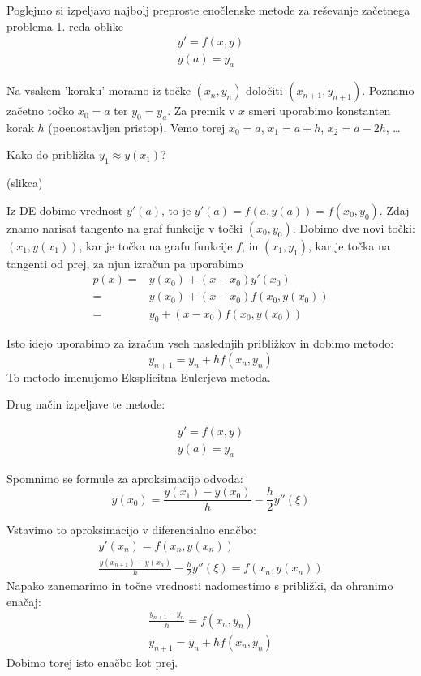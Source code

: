 \documentclass[a4paper,12pt]{article}
\theoremstyle{definition}
\theoremstyle{remark}
\begin{document}
Poglejmo si izpeljavo najbolj preproste enočlenske metode za reševanje začetnega problema 1. reda oblike
\begin{gather*}
    y' = f(x, y) \\
    y(a) = y_a
\end{gather*}

Na vsakem 'koraku' moramo iz točke $(x_n, y_n)$ določiti $(x_{n+1}, y_{n+1})$. Poznamo začetno točko $x_0 = a$ ter $y_0 = y_a$. Za premik v $x$ smeri
uporabimo konstanten korak $h$ (poenostavljen pristop). Vemo torej $x_0 = a$, $x_1 = a+h$, $x_2 = a-2h$, \dots

Kako do približka $y_1 \approx y(x_1)$?

(slikca)

Iz DE dobimo vrednost $y'(a)$, to je $y'(a) = f(a, y(a)) = f(x_0, y_0)$. Zdaj znamo narisat tangento na graf funkcije v točki $(x_0, y_0)$. Dobimo 
dve novi točki: $(x_1, y(x_1))$, kar je točka na grafu funkcije $f$, in $(x_1, y_1)$, kar je točka na tangenti od prej, za njun izračun pa uporabimo
\begin{align*}
    p(x) =& y(x_0) + (x-x_0)y'(x_0) \\
         =& y(x_0) + (x-x_0)f(x_0, y(x_0)) \\
         =& y_0 + (x-x_0)f(x_0, y(x_0))
\end{align*}

Isto idejo uporabimo za izračun vseh naslednjih približkov in dobimo metodo:
\begin{equation*}
    y_{n+1} = y_n + h f(x_n, y_n)
\end{equation*}
To metodo imenujemo Eksplicitna Eulerjeva metoda.

Drug način izpeljave te metode:

\begin{gather*}
    y' = f(x, y) \\
    y(a) = y_a
\end{gather*}

Spomnimo se formule za aproksimacijo odvoda:
\begin{equation*}
    y(x_0) = \frac{y(x_1) - y(x_0)}{h} - \frac{h}{2} y''(\xi)
\end{equation*}

Vstavimo to aproksimacijo v diferencialno enačbo:
\begin{gather*}
    y'(x_n) = f(x_n, y(x_n)) \\
    \frac{y(x_{n+1}) - y(x_n)}{h} - \frac{h}{2} y''(\xi) = f(x_n, y(x_n))
\end{gather*}
Napako zanemarimo in točne vrednosti nadomestimo s približki, da ohranimo enačaj:
\begin{gather*}
    \frac{y_{n+1}- y_n}{h} = f(x_n, y_n) \\
    y_{n+1} = y_n + h f(x_n, y_n)
\end{gather*}
Dobimo torej isto enačbo kot prej.
\end{document}
